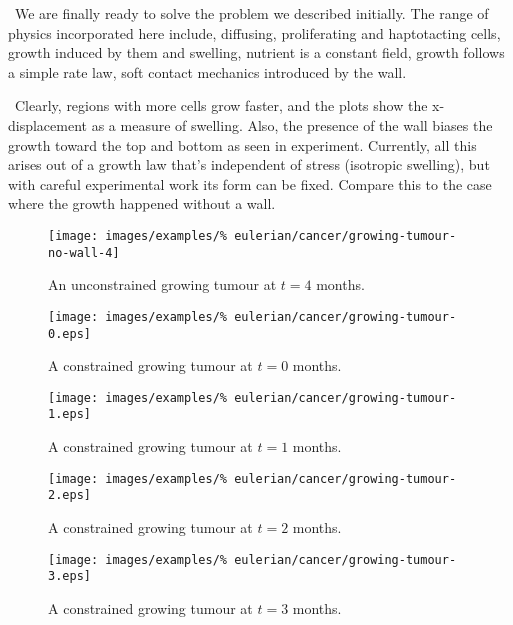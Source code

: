 \textbullet\ We are finally ready to solve the problem we described
initially. The range of physics incorporated here include, diffusing,
proliferating and haptotacting cells, growth induced by them and
swelling, nutrient is a constant field, growth follows a simple rate
law, soft contact mechanics introduced by the wall.

\textbullet\ Clearly, regions with more cells grow faster, and the
plots show the x-displacement as a measure of swelling. Also, the
presence of the wall biases the growth toward the top and bottom as
seen in experiment. Currently, all this arises out of a growth law
that's independent of stress (isotropic swelling), but with careful
experimental work its form can be fixed. Compare this to the case
where the growth happened without a wall.

\begin{figure}[!hptb]
\centering
\texttt{[image: images/examples/\%
eulerian/cancer/growing-tumour-no-wall-4]}
\caption{An unconstrained growing tumour at $t=4$ months.}
\label{tumour-growth-no-wall-4}
\end{figure}

\begin{figure}[!hptb]
\centering
\texttt{[image: images/examples/\%
eulerian/cancer/growing-tumour-0.eps]}
\caption{A constrained growing tumour at $t=0$ months.}
\label{tumour-growth-constrained-0}
\end{figure}

\begin{figure}[!hptb]
\centering
\texttt{[image: images/examples/\%
eulerian/cancer/growing-tumour-1.eps]}
\caption{A constrained growing tumour at $t=1$ months.}
\label{tumour-growth-constrained-1}
\end{figure}

\begin{figure}[!hptb]
\centering
\texttt{[image: images/examples/\%
eulerian/cancer/growing-tumour-2.eps]}
\caption{A constrained growing tumour at $t=2$ months.}
\label{tumour-growth-constrained-2}
\end{figure}

\begin{figure}[!hptb]
\centering
\texttt{[image: images/examples/\%
eulerian/cancer/growing-tumour-3.eps]}
\caption{A constrained growing tumour at $t=3$ months.}
\label{tumour-growth-constrained-3}
\end{figure}

